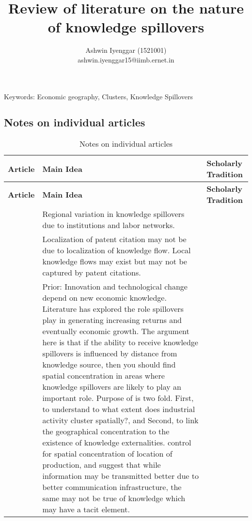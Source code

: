 \documentclass[12pt]{article}
\begin{document}
\title{\LARGE Review of literature on the nature of knowledge spillovers}

\author{Ashwin Iyenggar  (1521001) \\ ashwin.iyenggar15@iimb.ernet.in} 
\large

\maketitle
\thispagestyle{empty}

\begin{abstract}
\large \noindent 
\end{abstract}
{Keywords:} Economic geography, Clusters, Knowledge Spillovers
\onehalfspacing



\begin{center}
\section{Notes on individual articles}
 \begin{longtable}{|p{}|p{}|p{}|}
 \caption{Notes on individual articles\label{long}}\\
 
 \hline\textbf{Article}&\textbf{Main Idea}&\textbf{Scholarly Tradition}\\\hline
 \endfirsthead
 
 \hline\textbf{Article}&\textbf{Main Idea}&\textbf{Scholarly Tradition}\\\hline
 \endhead
 
 \hline
 \endfoot
 
 \hline
 \endlastfoot

\cite{Almeida1999} & Regional variation in knowledge spillovers due to institutions and labor networks.&\\\hline
\cite*{Arora2017a} & Localization of patent citation may not be due to localization of knowledge flow. Local knowledge flows may exist but may not be captured by patent citations.&\\\hline

\cite{Audretsch1996} & Prior: Innovation and technological change depend on new economic knowledge. Literature has explored the role spillovers play in generating increasing returns and eventually economic growth. The argument here is that if the ability to receive knowledge spillovers is influenced by distance from knowledge source, then you should find spatial concentration in areas where knowledge spillovers are likely to play an important role. Purpose of \cite{Audretsch1996} is two fold. First, to understand to what extent does industrial activity cluster spatially?, and Second, to link the geographical concentration to the existence of knowledge externalities. \cite{Audretsch1996} control for spatial concentration of location of production, and suggest that while information may be transmitted better due to better communication infrastructure, the same may not be true of knowledge which may have a tacit element. &\\\hline


\end{longtable}
\end{center}
\end{document}
